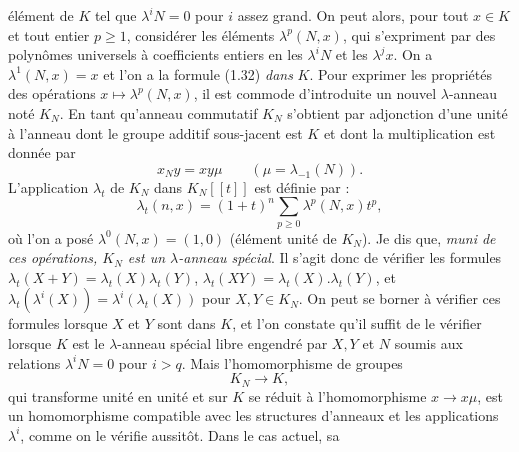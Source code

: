 élément de $K$ tel que $\lambda^iN=0$ pour $i$ assez grand. On peut alors, pour tout $x\in K$ et tout entier $p\geq1$, considérer les éléments $\lambda^p(N,x)$, qui s'expriment par des polynômes universels à coefficients entiers en les $\lambda^iN$ et les $\lambda^jx$. On a $\lambda^1(N,x)=x$ et l'on a la formule (1.32) \emph{dans} $K$. Pour exprimer les propriétés des opérations $x\mapsto\lambda^p(N,x)$, il est commode d'introduite un nouvel $\lambda$-anneau noté $K_N$. En tant qu'anneau commutatif $K_N$ s'obtient par adjonction d'une unité à l'anneau dont le groupe additif sous-jacent est $K$ et dont la multiplication est donnée par
\begin{equation}\tag{1.34}
x_Ny=xy\mu\qquad (\mu=\lambda_{-1}(N)).
\end{equation}
L'application $\lambda_t$ de $K_N$ dans $K_N[[t]]$ est définie par :
\begin{equation}\tag{1.35}
\lambda_t(n,x)=(1+t)^n\sum_{p\geq0}\lambda^p(N,x)t^p,
\end{equation}
où l'on a posé $\lambda^0(N,x)=(1,0)$ (élément unité de $K_N$). Je dis que, \emph{muni de ces opérations, $K_N$ est un $\lambda$-anneau spécial}. Il s'agit donc de vérifier les formules $\lambda_t(X+Y)=\lambda_t(X)\lambda_t(Y)$, $\lambda_t(XY)=\lambda_t(X).\lambda_t(Y)$, et $\lambda_t(\lambda^i(X))=\lambda^i(\lambda_t(X))$ pour $X,Y\in K_N$. On peut se borner à vérifier ces formules lorsque $X$ et $Y$ sont dans $K$, et l'on constate qu'il suffit de le vérifier lorsque $K$ est le $\lambda$-anneau spécial libre engendré par $X,Y$ et $N$ soumis aux relations $\lambda^iN=0$ pour $i>q$. Mais l'homomorphisme de groupes
\begin{equation}\tag{1.36}
K_N\longrightarrow K,
\end{equation}
qui transforme unité en unité et sur $K$ se réduit à l'homomorphisme $x\longrightarrow x\mu$, est un homomorphisme compatible avec les structures d'anneaux et les applications $\lambda^i$, comme on le vérifie aussitôt. Dans le cas actuel, sa

